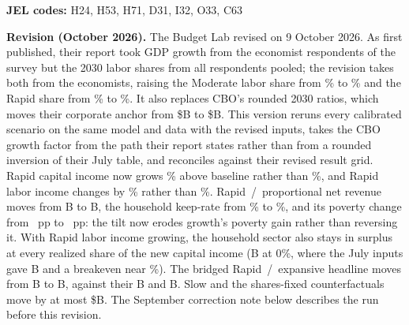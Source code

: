 \documentclass[11pt]{article}
\begin{document}
\medskip
\noindent\textbf{JEL codes:} H24, H53, H71, D31, I32, O33, C63

\newpage
\noindent\textbf{Revision (October 2026).} The Budget Lab revised
\citet{iselinnunn2026} on 9 October 2026. As first published, their report
took GDP growth from the economist respondents of the \citet{karger2026}
survey but the 2030 labor shares from all respondents pooled; the revision
takes both from the economists, raising the Moderate labor share from
\genRevModLaborShareOld\% to \genRevModLaborShareNew\% and the Rapid share
from \genRevRapidLaborShareOld\% to \genRevRapidLaborShareNew\%. It also
replaces CBO's rounded 2030 ratios, which moves their corporate anchor from
\$\genRevTheirCitAnchorOldB B to \$\genRevTheirCitAnchorNewB B. This version
reruns every calibrated scenario on the same model and data with the revised
inputs, takes the CBO growth factor from the path their report states rather
than from a rounded inversion of their July table, and reconciles against
their revised result grid. Rapid capital income now grows
\genRevRapidCapGrowthNew\% above baseline rather than
\genRevRapidCapGrowthOld\%, and Rapid labor income changes by
\genRevRapidLaborGrowthNew\% rather than \genRevRapidLaborGrowthOld\%.
Rapid~/~proportional net revenue moves from \genRevRapidPropRevOld B to
\genRevRapidPropRevNew B, the household keep-rate from
\genRevKeptHouseholdRapidOldPct\% to \genRevKeptHouseholdRapidNewPct\%, and
its poverty change from \genRevRapidPropPovPpOld~pp to
\genRevRapidPropPovPpNew~pp: the tilt now erodes growth's poverty gain rather
than reversing it. With Rapid labor income growing, the household sector also
stays in surplus at every realized share of the new capital income
(\genRevRealZeroRevNew B at 0\%, where the July inputs gave
\genRevRealZeroRevOld B and a breakeven near \genRevRealBreakevenOldPct\%). The bridged Rapid~/~expansive headline moves
from \genRevBridgeOursOld B to \genRevBridgeOursNew B, against their
\genRevBridgeTheirsOld B and \genRevBridgeTheirsNew B. Slow and the
shares-fixed counterfactuals move by at most \$\genRevUntouchedMaxMoveB B.
The September correction note below describes the run before this revision.
\end{document}
